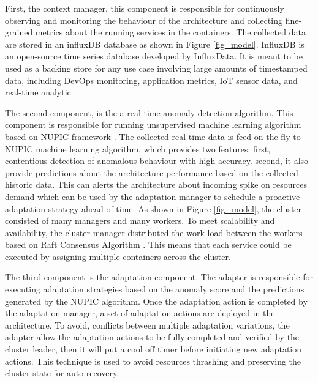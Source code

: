 \documentclass[sigconf]{acmart}
\begin{document}
First, the context manager, this component is responsible for continuously observing and monitoring the behaviour of the architecture and collecting fine-grained metrics about the running services in the containers. The collected data are stored in an influxDB database as shown in Figure \ref{fig_model}. InfluxDB is an open-source time series database developed by InfluxData. It is meant to be used as a backing store for any use case involving large amounts of timestamped data, including DevOps monitoring, application metrics, IoT sensor data, and real-time analytic \cite{InfluxDB:uh}.


The second component, is the a real-time anomaly detection algorithm. This component is responsible for running unsupervised machine learning algorithm based on NUPIC framework \cite{AHMAD2017134}. The collected real-time data is feed on the fly to NUPIC machine learning algorithm, which provides two features: first, contentious detection of anomalous behaviour with high accuracy. second, it also provide predictions about the architecture performance based on the collected historic data. This can alerts the architecture about incoming spike on resources demand which can be used by the adaptation manager to schedule a proactive adaptation strategy ahead of time. As shown in Figure \ref{fig_model}, the cluster consisted of many managers and many workers. To meet scalability and availability, the cluster manager distributed the work load between the workers based on Raft Consensus Algorithm \cite{ongaro2015raft}. This means that each  service could be executed by assigning multiple containers across the cluster.   


The third component is the adaptation component. The adapter is responsible for executing adaptation strategies based on the anomaly score and the predictions generated by the NUPIC algorithm. Once the adaptation action is completed by the adaptation manager, a set of adaptation actions are deployed in the architecture. To avoid, conflicts between multiple adaptation variations, the adapter allow the adaptation actions to be fully completed and verified by the cluster leader, then it will put a cool off timer before initiating new adaptation actions. This technique is used to avoid resources thrashing and preserving the cluster state for auto-recovery.
\end{document}
